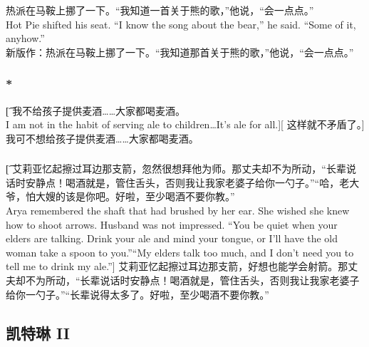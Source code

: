 \documentclass[12pt,a4paper]{article}
\begin{document}
\subsubsection{}\color{blue}	
	热派在马鞍上挪了一下。“我知道一首关于熊的歌，”他说，“会一点点。” \\
	Hot Pie shifted his seat. “I know the song about the bear,” he said. “Some of it, anyhow.” \\
	\color{black}
	新版作：热派在马鞍上挪了一下。“我知道那首关于熊的歌，”他说，“会一点点。” 
	
\subsubsection{\color{red}*}\t[
	我不给孩子提供麦酒……大家都喝麦酒。\\
	I am not in the habit of serving ale to children\ldots It's ale for all.][
	这样就不矛盾了。]
	我可不想给孩子提供麦酒……大家都喝麦酒。
	
\subsubsection{}\t[ 
	艾莉亚忆起擦过耳边那支箭，忽然很想拜他为师。那丈夫却不为所动，“长辈说话时安静点！喝酒就是，管住舌头，否则我让我家老婆子给你一勺子。”“哈，老大爷，怕大嫂的该是你吧。好啦，至少喝酒不要你教。”\\
	Arya remembered the shaft that had brushed by her ear. She wished she knew how to shoot arrows. Husband was not impressed. “You be quiet when your elders are talking. Drink your ale and mind your tongue, or I'll have the old woman take a spoon to you.”“My elders talk too much, and I don't need you to tell me to drink my ale.”]
	艾莉亚忆起擦过耳边那支箭，好想也能学会射箭。那丈夫却不为所动，“长辈说话时安静点！喝酒就是，管住舌头，否则我让我家老婆子给你一勺子。”“长辈说得太多了。好啦，至少喝酒不要你教。”
	
		
\subsection{凯特琳 II}
\end{document}
